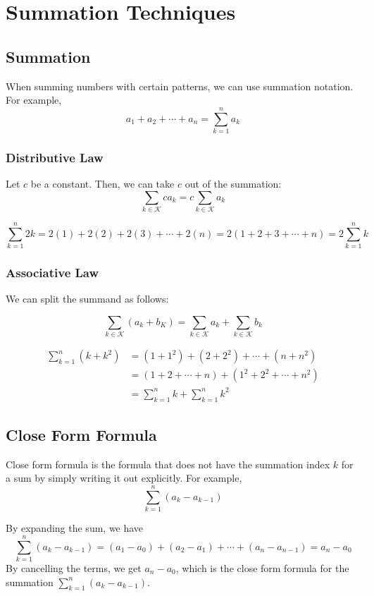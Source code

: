 \chapter{Summation Techniques}

\section{Summation}
When summing numbers with certain patterns, we can use summation notation. For example,
\[
	a_1 + a_2 + \cdots + a_n = \sum_{k=1}^n a_k 
\]

\subsection{Distributive Law}
Let \(c\) be a constant. Then, we can take \(c\) out of the summation:
\[
	\sum_{k\in\mathcal{K} } ca_k = c\sum_{k\in\mathcal{K} }a_k 
\]

\begin{eg}
	\[
		\sum_{k=1}^n 2k = 2(1) + 2(2) + 2(3) + \cdots + 2(n) = 2(1 + 2 + 3 + \cdots + n) = 2\sum_{k=1}^n k  
	\]
\end{eg}

\subsection{Associative Law}
We can split the summand as follows:

\[
	\sum_{k\in\mathcal{K}}(a_k + b_K) = \sum_{k\in\mathcal{K}}a_k + \sum_{k\in\mathcal{K}}b_k
\]

\begin{eg}
	\[\begin{aligned}
		\sum_{k = 1}^n(k + k^2) &= (1 + 1^2) + (2 + 2^2) + \cdots + (n + n^2) \\
		&= (1 + 2 + \cdots + n) + (1^2 + 2^2 + \cdots + n^2) \\
		&= \sum_{k = 1}^n k + \sum_{k = 1}^n k^2
	\end{aligned}\]
\end{eg}

\section{Close Form Formula}
Close form formula is the formula that does not have the summation index \(k\) for a sum by simply writing it out explicitly. For example,
\[
	\sum_{k = 1}^n (a_{k} - a_{k-1})
\]

By expanding the sum, we have
\[
	\sum_{k = 1}^n (a_{k} - a_{k-1}) = (a_1 - a_0) + (a_2 - a_1) + \cdots + (a_n - a_{n-1}) = a_n - a_0
\]
By cancelling the terms, we get \(a_n - a_0\), which is the close form formula for the summation \(\sum_{k = 1}^n (a_{k} - a_{k-1})\).

